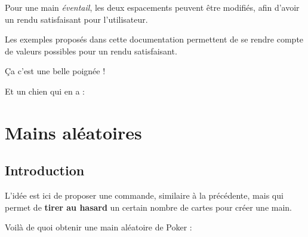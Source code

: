 \documentclass{article}
\begin{document}
{{{{{{{{{\begin{codeinfo}
\smallskip

Pour une main \textit{éventail}, les deux espacements peuvent être modifiés, afin d'avoir un rendu satisfaisant pour l'utilisateur.

\smallskip

Les exemples proposés dans cette documentation permettent de se rendre compte de valeurs possibles pour un rendu satisfaisant.
\end{codeinfo}

\begin{codetex}[]

\smallskip


\smallskip

Ça c'est une belle poignée ! 

\smallskip

Et un chien qui en a  : 
\end{codetex}

\pagebreak

\section{Mains aléatoires}

\subsection{Introduction}

\begin{codeidee}
L'idée est ici de proposer une commande, similaire à la précédente, mais qui permet de \textbf{tirer au hasard} un certain nombre de cartes pour créer une main.
\end{codeidee}

\begin{codetex}
\end{codetex}

\begin{codetex}[]
Voilà de quoi obtenir une main aléatoire de Poker :


\end{codetex}}}}}}}}}}
\end{document}
